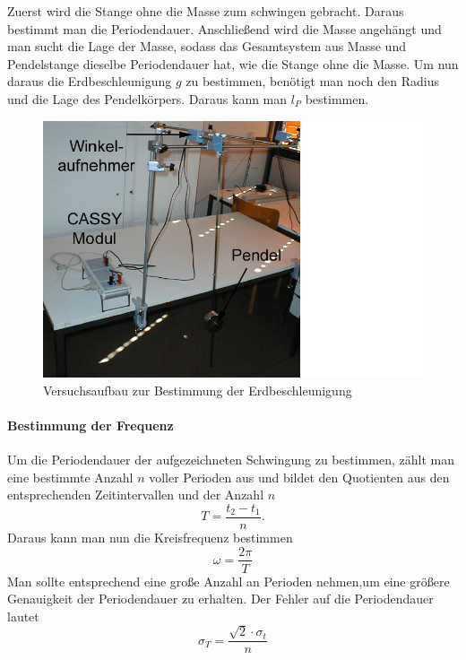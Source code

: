 \documentclass[a4paper, 11pt]{article}
\begin{document}
Zuerst wird die Stange ohne die Masse zum schwingen gebracht. Daraus bestimmt man die Periodendauer. Anschließend wird die Masse angehängt und man sucht die Lage der Masse, sodass das Gesamtsystem aus Masse und Pendelstange dieselbe Periodendauer hat, wie die Stange ohne die Masse. Um nun daraus die Erdbeschleunigung $g$ zu bestimmen, benötigt man noch den Radius und die Lage des Pendelkörpers. Daraus kann man $l_P$ bestimmen.   

\begin{figure}[H]
\centering
\includegraphics[trim=0 0 6cm 0,clip=True,scale=0.6]{Cassy}
\caption{Versuchsaufbau zur Bestimmung der Erdbeschleunigung}
\label{pic: Cassy}
\end{figure}

\paragraph{Bestimmung der Frequenz}
Um die Periodendauer der aufgezeichneten Schwingung zu bestimmen, zählt man eine bestimmte Anzahl $n$ voller Perioden aus und bildet den Quotienten aus den entsprechenden Zeitintervallen und der Anzahl $n$ 
\begin{equation}
T = \frac{t_2 - t_1}{n}.
\end{equation}
Daraus kann man nun die Kreisfrequenz bestimmen
\begin{equation}
\omega = \frac{2\pi}{T}
\end{equation}
Man sollte entsprechend eine große Anzahl an Perioden nehmen,um eine größere Genauigkeit der Periodendauer zu erhalten.
Der Fehler auf die Periodendauer lautet
\begin{equation}
\sigma_T = \frac{\surd 2 \cdot \sigma_t }{n}
\end{equation}
\end{document}
